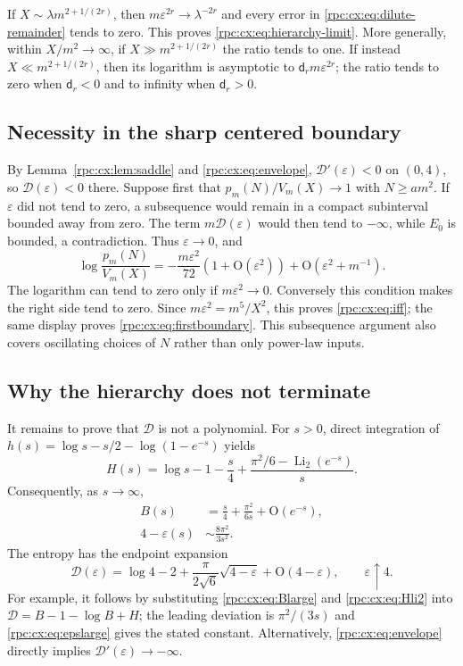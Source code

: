\documentclass[11pt]{article}
\theoremstyle{definition}
\theoremstyle{remark}
\numberwithin{equation}{section}
\begin{document}
If $X\sim\lambda m^{2+1/(2r)}$, then
$m\varepsilon^{2r}\to\lambda^{-2r}$ and every error in
\eqref{rpc:cx:eq:dilute-remainder} tends to zero. This proves
\eqref{rpc:cx:eq:hierarchy-limit}. More generally, within $X/m^2\to\infty$,
if $X\gg m^{2+1/(2r)}$ the ratio tends to one. If instead
$X\ll m^{2+1/(2r)}$, then its logarithm is asymptotic to
$\mathsf d_rm\varepsilon^{2r}$; the ratio tends to zero when $\mathsf d_r<0$ and to infinity when
$\mathsf d_r>0$.

\subsection{Necessity in the sharp centered boundary}
By Lemma~\ref{rpc:cx:lem:saddle} and \eqref{rpc:cx:eq:envelope},
$\mathcal D'(\varepsilon)<0$ on $(0,4)$, so $\mathcal D(\varepsilon)<0$ there.
Suppose first that $p_m(N)/V_m(X)\to1$ with $N\ge am^2$.
If $\varepsilon$ did not tend to zero, a subsequence would remain in a compact
subinterval bounded away from zero. The term $m\mathcal D(\varepsilon)$ would then tend
to $-\infty$, while $E_0$ is bounded, a contradiction.
Thus $\varepsilon\to0$, and
\begin{equation}
 \log\frac{p_m(N)}{V_m(X)}
 =-\frac{m\varepsilon^2}{72}(1+\mathrm O(\varepsilon^2))
        +\mathrm O(\varepsilon^2+m^{-1}).
\end{equation}
The logarithm can tend to zero only if $m\varepsilon^2\to0$.
Conversely this condition makes the right side tend to zero.
Since $m\varepsilon^2=m^5/X^2$, this proves \eqref{rpc:cx:eq:iff}; the same display
proves \eqref{rpc:cx:eq:firstboundary}. This subsequence argument also covers
oscillating choices of $N$ rather than only power-law inputs.

\subsection{Why the hierarchy does not terminate}
It remains to prove that $\mathcal D$ is not a polynomial. For $s>0$, direct
integration of $h(s)=\log s-s/2-\log(1-e^{-s})$ yields
\begin{equation}\label{rpc:cx:eq:Hli2}
 H(s)=\log s-1-\frac s4+
       \frac{\pi^2/6-\operatorname{Li}_2(e^{-s})}{s}.
\end{equation}
Consequently, as $s\to\infty$,
\begin{align}
 B(s)&=\frac s4+\frac{\pi^2}{6s}+\mathrm O(e^{-s}),\label{rpc:cx:eq:Blarge}\\
 4-\varepsilon(s)&\sim\frac{8\pi^2}{3s^2}.\label{rpc:cx:eq:epslarge}
\end{align}
The entropy has the endpoint expansion
\begin{equation}\label{rpc:cx:eq:Dendpoint}
 \mathcal D(\varepsilon)=\log4-2+
       \frac{\pi}{2\sqrt6}\sqrt{4-\varepsilon}+\mathrm O(4-\varepsilon),
       \qquad \varepsilon\uparrow4.
\end{equation}
For example, it follows by substituting \eqref{rpc:cx:eq:Blarge} and
\eqref{rpc:cx:eq:Hli2} into $\mathcal D=B-1-\log B+H$; the leading deviation is
$\pi^2/(3s)$ and \eqref{rpc:cx:eq:epslarge} gives the stated constant.
Alternatively, \eqref{rpc:cx:eq:envelope} directly implies
$\mathcal D'(\varepsilon)\to-\infty$.
\end{document}

